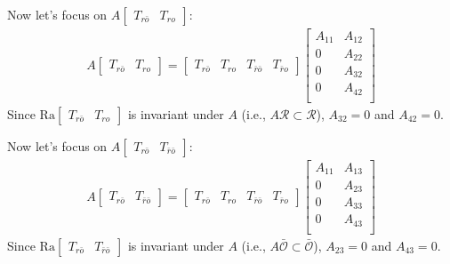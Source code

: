 \documentclass[twoside, 11pt, a4paper]{article}
\begin{document}
Now let's focus on $A \left[ \begin{array}{c|c} T_{r\bar{o}} & T_{ro} \end{array} \right]$:
%
\begin{align*}
    A \left[ \begin{array}{c|c} T_{r\bar{o}} & T_{ro} \end{array} \right] = \left[ \begin{array}{c|c|c|c} T_{r\bar{o}} & T_{ro} & T_{\bar{r} \bar{o}} & T_{\bar{r} o} \end{array} \right]
    \left[ \begin{array}{c|c} A_{11} & A_{12} \\ \hline 
    0 & A_{22} \\ \hline 
    0 & A_{32} \\ \hline 
    0 & A_{42} \\ 
    \end{array} \right]
\end{align*}
%
Since $\mathrm{Ra}\left[ \begin{array}{c|c} T_{r\bar{o}} & T_{ro} \end{array} \right]$ is invariant under $A$ (i.e., $A \mathcal{R} \subset \mathcal{R}$), $A_{32} = 0$ and $A_{42} = 0$. 

Now let's focus on $A \left[ \begin{array}{c|c} T_{r\bar{o}} & T_{\bar{r}\bar{o}} \end{array} \right]$:
%
\begin{align*}
    A \left[ \begin{array}{c|c} T_{r\bar{o}} & T_{\bar{r}\bar{o}} \end{array} \right] = \left[ \begin{array}{c|c|c|c} T_{r\bar{o}} & T_{ro} & T_{\bar{r}\bar{o}} & T_{\bar{r} o} \end{array} \right]
    \left[ \begin{array}{c|c} A_{11} & A_{13} \\ \hline 
    0 & A_{23} \\ \hline 
    0 & A_{33} \\ \hline 
    0 & A_{43} \\ 
    \end{array} \right]
\end{align*}
%
Since $\mathrm{Ra}\left[ \begin{array}{c|c} T_{r\bar{o}} & T_{\bar{r}\bar{o}} \end{array} \right]$ is invariant under $A$ (i.e., $A \bar{\mathcal{O}} \subset \bar{\mathcal{O}}$), $A_{23} = 0$ and $A_{43} = 0$. 
\end{document}
